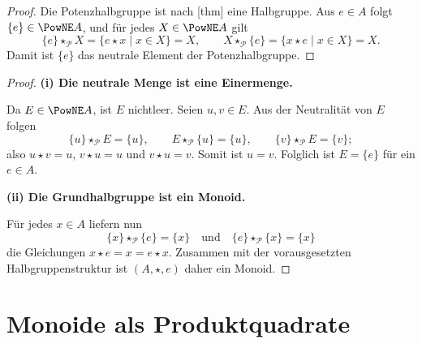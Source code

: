 \documentclass[main.tex]{subfiles}
\begin{document}
\begin{proof}
Die Potenzhalbgruppe ist nach
[thm] eine Halbgruppe.  Aus
\(e\in A\) folgt \(\{e\}\in\PowNE A\), und für jedes
\(X\in\PowNE A\) gilt
\[
  \{e\}\star_{\mathcal P}X
  =\{e\star x\mid x\in X\}=X,
  \qquad
  X\star_{\mathcal P}\{e\}
  =\{x\star e\mid x\in X\}=X.
\]
Damit ist \(\{e\}\) das neutrale Element der Potenzhalbgruppe.
\end{proof}

\begin{proof}
\par\medskip\noindent\textbf{(i) Die neutrale Menge ist eine Einermenge.}\par
Da \(E\in\PowNE A\), ist \(E\) nichtleer.  Seien \(u,v\in E\).  Aus der
Neutralität von \(E\) folgen
\[
  \{u\}\star_{\mathcal P}E=\{u\},
  \qquad
  E\star_{\mathcal P}\{u\}=\{u\},
  \qquad
  \{v\}\star_{\mathcal P}E=\{v\};
\]
also \(u\star v=u\), \(v\star u=u\) und \(v\star u=v\).  Somit ist
\(u=v\).  Folglich ist
\(E=\{e\}\) für ein \(e\in A\).  \par\medskip\noindent\textbf{(ii) Die Grundhalbgruppe ist ein Monoid.}\par
Für jedes \(x\in A\) liefern nun
\[
  \{x\}\star_{\mathcal P}\{e\}=\{x\}
  \quad\text{und}\quad
  \{e\}\star_{\mathcal P}\{x\}=\{x\}
\]
die Gleichungen \(x\star e=x=e\star x\).  Zusammen mit der vorausgesetzten
Halbgruppenstruktur ist \((A,\star,e)\) daher ein Monoid.
\end{proof}

\section{Monoide als Produktquadrate}
\end{document}
